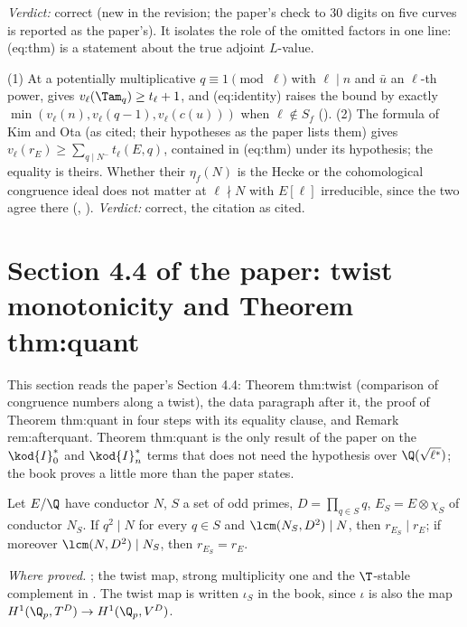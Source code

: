 \begin{sloppypar}
\noindent\emph{Verdict:} correct (new in the revision; the paper's check to $30$ digits on five curves is reported as the paper's). It isolates the role of the omitted
factors in one line: (eq:thm) is a statement about the true adjoint $L$-value.

\begin{remark}\label{rem:paper:ko}
(1) At a potentially multiplicative $q\equiv1\pmod\ell$ with $\ell\mid n$ and $\bar u$ an $\ell$-th power,  gives $v_\ell(\Tam_q)\ge t_\ell+1$, and (eq:identity) raises the bound by
exactly $\min(v_\ell(n),v_\ell(q-1),v_\ell(c(u)))$ when $\ell\notin S_f$ (). (2) The formula of Kim and Ota \cite[Theorem 1.1, Definition 2.12]{KimOta} (as cited; their
hypotheses as the paper lists them) gives $v_\ell(r_E)\ge\sum_{q\mid N^-}t_\ell(E,q)$, contained in (eq:thm) under its hypothesis; the equality is theirs. Whether their $\eta_f(N)$ is the Hecke or
the cohomological congruence ideal does not matter at $\ell\nmid N$ with $E[\ell]$ irreducible, since the two agree there (, ). \emph{Verdict:}
correct, the citation as cited.
\end{remark}

\section[Paper 4.4: Theorem thm:quant]{Section 4.4 of the paper: twist monotonicity and Theorem thm:quant}\label{sec:paper:twisting}

This section reads the paper's Section 4.4: Theorem thm:twist (comparison of congruence numbers along a twist), the data paragraph after it, the proof of
Theorem thm:quant in four steps with its equality clause, and Remark rem:afterquant. Theorem thm:quant is the only result of the paper on the
$\kod{I}_0^*$ and $\kod{I}_n^*$ terms that does not need the hypothesis over $\Q(\sqrt{\ell^*})$; the book proves a little more than the paper states.

\begin{theorem}\label{thm:paper:twist}
Let $E/\Q$ have conductor $N$, $S$ a set of odd primes, $D=\prod_{q\in S}q$, $E_S=E\otimes\chi_S$ of conductor $N_S$. If $q^2\mid N$ for every $q\in S$ and $\lcm(N_S,D^2)\mid N$, then $r_{E_S}\mid r_E$;
if moreover $\lcm(N,D^2)\mid N_S$, then $r_{E_S}=r_E$.
\end{theorem}

\noindent\emph{Where proved.} ; the twist map, strong multiplicity one and the $\T$-stable complement in . The twist map is written
$\iota_S$ in the book, since $\iota$ is also the map $H^1(\Q_p,T^D)\to H^1(\Q_p,V^D)$.


\end{sloppypar}
